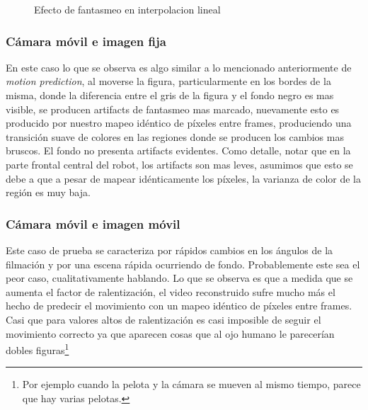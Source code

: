 \begin{figure}[H]
    \centering
    \caption{Efecto de fantasmeo en interpolacion lineal}
    \label{fig:artifact}
\end{figure}

\subsubsection*{Cámara móvil e imagen fija}
En este caso lo que se observa es algo similar a lo mencionado anteriormente de \emph{motion prediction}, al moverse la figura, particularmente en los bordes de la misma, donde la diferencia entre el gris de la figura y el fondo negro es mas visible, se producen artifacts de fantasmeo mas marcado, nuevamente esto es producido por nuestro mapeo idéntico de píxeles entre frames, produciendo una transición suave de colores en las regiones donde se producen los cambios mas bruscos. El fondo no presenta artifacts evidentes. Como detalle, notar que en la parte frontal central del robot, los artifacts son mas leves, asumimos que esto se debe a que a pesar de mapear idénticamente los píxeles, la varianza de color de la región es muy baja.

\subsubsection*{Cámara móvil e imagen móvil}
Este caso de prueba se caracteriza por rápidos cambios en los ángulos de la filmación y por una escena rápida ocurriendo de fondo. Probablemente este sea el peor caso, cualitativamente hablando. Lo que se observa es que a medida que se aumenta el factor de ralentización, el video reconstruido sufre mucho más el hecho de predecir el movimiento con un mapeo idéntico de píxeles entre frames. Casi que para valores altos de ralentización es casi imposible de seguir el movimiento correcto ya que aparecen cosas que al ojo humano le parecerían dobles figuras\footnote{Por ejemplo cuando la pelota y la cámara se mueven al mismo tiempo, parece que hay varias pelotas.}

